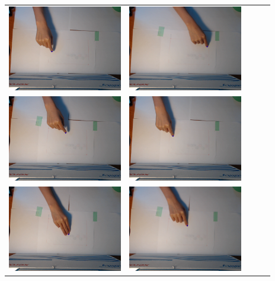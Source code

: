 \begin{tabular}{lllll}
\includegraphics[width=5cm]{fig3/im1_101.png} &
\includegraphics[width=5cm]{fig3/im1_111.png} \\
\includegraphics[width=5cm]{fig3/im1_11.png} &
\includegraphics[width=5cm]{fig3/im1_131.png} \\
\includegraphics[width=5cm]{fig3/im2_11.png} &
\includegraphics[width=5cm]{fig3/im2_121.png} \\

\end{tabular}
